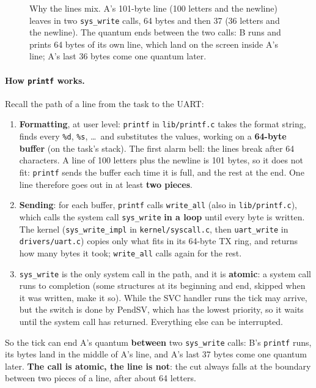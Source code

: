 \begin{figure}[H]
{}
\caption{Why the lines mix. A's 101-byte line (100 letters and the newline) leaves in two \texttt{sys\_write} calls, 64 bytes and then 37 (36 letters and the newline). The quantum ends between the two calls: B runs and prints 64 bytes of its own line, which land on the screen inside A's line; A's last 36 bytes come one quantum later.}
\end{figure}

\paragraph{How \texttt{printf} works.} Recall the path of a line from the task to the UART:
\begin{enumerate}
    \item \textbf{Formatting}, at user level: \texttt{printf} in \texttt{lib/printf.c} takes the format string, finds every \texttt{\%d}, \texttt{\%s}, \dots\ and substitutes the values, working on a \textbf{64-byte buffer} (on the task's stack). The first alarm bell: the lines break after 64 characters. A line of 100 letters plus the newline is 101 bytes, so it does not fit: \texttt{printf} sends the buffer each time it is full, and the rest at the end. One line therefore goes out in at least \textbf{two pieces}.
    \item \textbf{Sending}: for each buffer, \texttt{printf} calls \texttt{write\_all} (also in \texttt{lib/printf.c}), which calls the system call \texttt{sys\_write} \textbf{in a loop} until every byte is written. The kernel (\texttt{sys\_write\_impl} in \texttt{kernel/syscall.c}, then \texttt{uart\_write} in \texttt{drivers/uart.c}) copies only what fits in its 64-byte TX ring, and returns how many bytes it took; \texttt{write\_all} calls again for the rest.
    \item \texttt{sys\_write} is the only system call in the path, and it is \textbf{atomic}: a system call runs to completion (some structures at its beginning and end, skipped when it was written, make it so). While the SVC handler runs the tick may arrive, but the switch is done by PendSV, which has the lowest priority, so it waits until the system call has returned. Everything else can be interrupted.
\end{enumerate}
So the tick can end A's quantum \textbf{between} two \texttt{sys\_write} calls: B's \texttt{printf} runs, its bytes land in the middle of A's line, and A's last 37 bytes come one quantum later. \textbf{The call is atomic, the line is not}: the cut always falls at the boundary between two pieces of a line, after about 64 letters.

